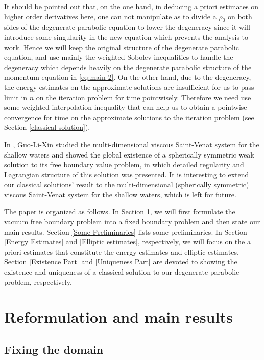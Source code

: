 \documentclass[11pt, reqno]{amsart}
\numberwithin{equation}{section}
\begin{document}
It should be pointed out that, on the one hand, in deducing a priori estimates on higher order derivatives here, one can not manipulate as \cite{MR2779087} to divide a \(\rho_0\) on both sides of the degenerate parabolic equation to lower the degeneracy since it will introduce some singularity in the new equation which  prevents the analysis to work. Hence we will keep the original structure of the degenerate parabolic equation, and use mainly the weighted Sobolev inequalities to handle the degeneracy which depends heavily on the degenerate parabolic structure of the momentum equation in \eqref{eq:main-2}. On the other hand, due to the degeneracy, the energy estimates on the
 approximate solutions are insufficient for us to pass limit in \(n\) on the iteration problem for time pointwisely. 
Therefore we need use some weighted interpolation inequality that can help us to obtain a pointwise convergence for time
on the approximate solutions to the iteration problem (see Section \ref{classical solution}). 


In \cite{MR2864798}, Guo-Li-Xin studied the multi-dimensional
viscous Saint-Venat system for the shallow waters and showed the global existence of a spherically symmetric
weak solution to its free boundary value problem, in which detailed regularity and Lagrangian structure
of this solution was presented. It is interesting to extend our classical solutions' result to the multi-dimensional (spherically symmetric) viscous Saint-Venat system for the shallow waters, which is left for future.




The paper is organized as follows. In Section \ref{main results}, we will first formulate the vacuum free boundary problem into a fixed boundary problem and then state our main results.  Section \ref{Some Preliminaries} lists some preliminaries. 
In Section \ref{Energy Estimates} and \ref{Elliptic estimates}, respectively, 
we will focus on the a priori estimates that constitute the energy estimates and elliptic estimates. Section \ref{Existence Part} and \ref{Uniqueness Part} are devoted to showing the existence and uniqueness of a classical solution to our degenerate parabolic problem, respectively. 




\section{Reformulation and main results}\label{main results}

\subsection{Fixing the domain}
\end{document}
